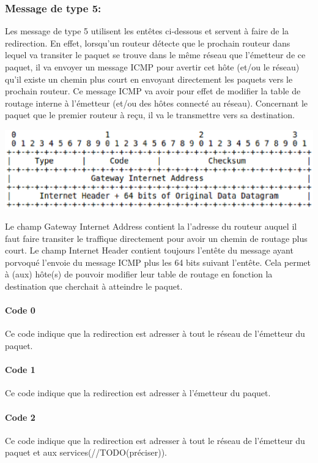 \subsubsection{Message de type 5:} Les message de type 5 utilisent les entêtes
ci-dessous et servent à faire de la redirection. En effet, lorsqu'un routeur
détecte que le prochain routeur dans lequel va transiter le paquet se trouve
dans le même réseau que l'émetteur de ce paquet, il va envoyer un message ICMP
pour avertir cet hôte (et/ou le réseau) qu'il existe un chemin plus court en
envoyant directement les paquets vers le prochain routeur. Ce message ICMP va
avoir pour effet de modifier la table de routage interne à l'émetteur (et/ou
des hôtes connecté au réseau). Concernant le paquet que le premier routeur à
reçu, il va le transmettre vers sa destination.

\includegraphics[width=15cm]{./pics/header2.eps}

Le champ Gateway Internet Address contient la l'adresse du routeur auquel il
faut faire transiter le traffique directement pour avoir un chemin de routage
plus court.  Le champ Internet Header contient toujours l'entête du message
ayant porvoqué l'envoie du message ICMP plus les 64 bits suivant l'entête. Cela
permet à (aux) hôte(s) de pouvoir modifier leur table de routage en fonction la
destination que cherchait à atteindre le paquet.

\paragraph{Code 0}
Ce code indique que la redirection est adresser à tout le réseau de l'émetteur du
paquet.

\paragraph{Code 1}
Ce code indique que la redirection est adresser à l'émetteur du paquet.

\paragraph{Code 2}
Ce code indique que la redirection est adresser à tout le réseau de l'émetteur
du paquet et aux services(//TODO(préciser)).

